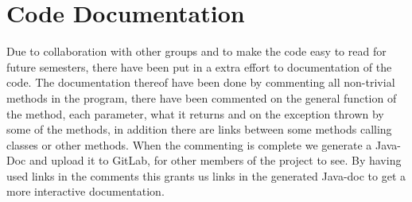 \section{Code Documentation} \label{sec:code_documentation}
Due to collaboration with other groups and to make the code easy to read for future semesters, there have been put in a extra effort to documentation of the code. The documentation thereof have been done by commenting all non-trivial methods in the program, there have been commented on the general function of the method, each parameter, what it returns and on the exception thrown by some of the methods, in addition there are links between some methods calling classes or other methods. When the commenting is complete we generate a Java-Doc and upload it to GitLab, for other members of the project to see. By having used links in the comments this grants us links in the generated Java-doc to get a more interactive documentation. 
